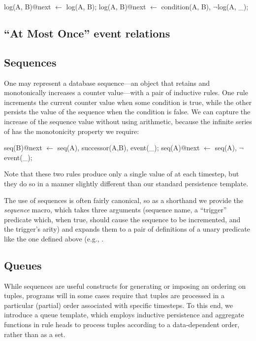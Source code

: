 \begin{Dedalus}
log(A, B)@next \(\leftarrow\) log(A, B);
log(A, B)@next \(\leftarrow\) condition(A, B), \(\lnot\)log(A, _);
\end{Dedalus}



\subsection{``At Most Once'' event relations}



\subsection{Sequences}
One may represent a database sequence---an object that retains and monotonically increases a counter value---with a pair of inductive rules.  One rule increments the current counter value when some condition is 
true, while the other persists the value of the sequence when the condition is false.  We can capture the increase
of the sequence value without using arithmetic, because the infinite series of  has the monotonicity
property we require:

\begin{Dedalus}
seq(B)@next \(\leftarrow\) seq(A), successor(A,B), event(_);  
seq(A)@next \(\leftarrow\) seq(A), \(\lnot\)event(_);
\end{Dedalus}

\noindent
Note that these two rules produce only a single value of  at each timestep, but they do so in a manner slightly different than our standard persistence template.

The use of sequences is often fairly canonical, so as a shorthand we provide the {\em sequence}
macro, which takes three arguments (sequence name, a ``trigger'' predicate which, when true, 
should cause the sequence to be incremented, and the trigger's arity) and expands them to a pair 
of definitions of a unary predicate like the one defined above (e.g., .

\subsection{Queues}

While sequences are useful constructs for generating or imposing an ordering on tuples, programs will in some cases require that tuples
are processed in a particular (partial) order associated with specific timesteps.   To this end, we introduce a queue template, which employs 
inductive persistence and aggregate functions in rule heads to process tuples according to a data-dependent order, rather than as a set.

